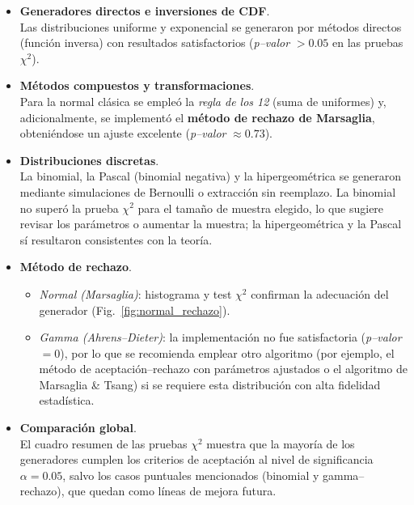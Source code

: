 \documentclass[11pt]{article}
\begin{document}
\begin{itemize}
    \item \textbf{Generadores directos e inversiones de CDF}.\\
          Las distribuciones uniforme y exponencial se generaron por métodos directos (función
          inversa) con resultados satisfactorios (\emph{p–valor} $>0.05$ en las pruebas $\chi^{2}$).

    \item \textbf{Métodos compuestos y transformaciones}.\\
          Para la normal clásica se empleó la \emph{regla de los 12} (suma de uniformes) y,
          adicionalmente, se implementó el \textbf{método de rechazo de Marsaglia}, obteniéndose un
          ajuste excelente (\emph{p–valor} $\approx0.73$).

    \item \textbf{Distribuciones discretas}.\\
          La binomial, la Pascal (binomial negativa) y la hipergeométrica se generaron
          mediante simulaciones de Bernoulli o extracción sin reemplazo. La binomial no superó
          la prueba $\chi^{2}$ para el tamaño de muestra elegido, lo que sugiere revisar los
          parámetros o aumentar la muestra; la hipergeométrica y la Pascal sí resultaron
          consistentes con la teoría.

    \item \textbf{Método de rechazo}.\\
          \begin{itemize}
              \item \emph{Normal (Marsaglia)}: histograma y test $\chi^{2}$ confirman la adecuación
                    del generador (Fig.~\ref{fig:normal_rechazo}).
              \item \emph{Gamma (Ahrens–Dieter)}: la implementación no fue satisfactoria
                    (\emph{p–valor} $=0$), por lo que se recomienda emplear otro algoritmo
                    (por ejemplo, el método de aceptación–rechazo con parámetros ajustados o
                    el algoritmo de Marsaglia \& Tsang) si se requiere esta distribución con alta
                    fidelidad estadística.
          \end{itemize}

    \item \textbf{Comparación global}.\\
          El cuadro resumen de las pruebas $\chi^{2}$ muestra que la mayoría de los
          generadores cumplen los criterios de aceptación al nivel de significancia
          $\alpha = 0.05$, salvo los casos puntuales mencionados (binomial y
          gamma–rechazo), que quedan como líneas de mejora futura.
\end{itemize}
\end{document}
